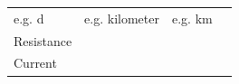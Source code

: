 \begin{enumerate}[noitemsep, label=\textbf{\arabic*}. ]
{{\begin{center}
\begin{xtabular}[t]{|l|l|l|l|}
        e.g. d &
    
    
        e.g. kilometer &
    
    
        e.g. km%
     \tabularnewline{}
    
    
        Resistance &
    
    
         &
    
    
         &
    
    
     \tabularnewline{}
    
    
        Current &
    
    

\end{xtabular}
\end{center}}}
\end{enumerate}
